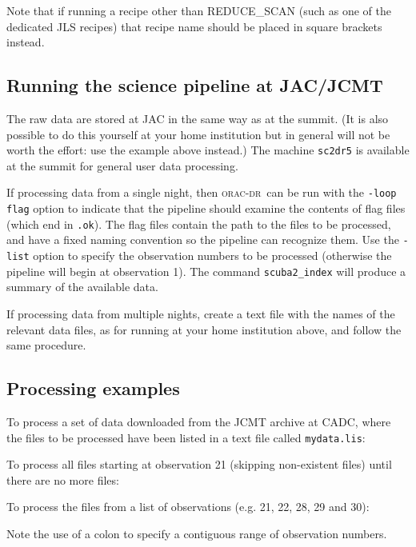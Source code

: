 \documentclass[twoside,11pt,nolof]{starlink}
\providecommand{\oracdr}{\textsc{orac-dr}}
\begin{document}
Note that if running a recipe other than REDUCE\_SCAN (such as one of
the dedicated JLS recipes) that recipe name should be placed in square
brackets instead.

\subsection{Running the science pipeline at JAC/JCMT}

The raw data are stored at JAC in the same way as at the summit. (It
is also possible to do this yourself at your home institution but in
general will not be worth the effort: use the example above instead.)
The machine \verb+sc2dr5+ is available at the summit for general user
data processing.

If processing data from a single night, then \oracdr\ can be run with
the \texttt{-loop flag} option to indicate that the pipeline should
examine the contents of flag files (which end in \verb+.ok+). The flag
files contain the path to the files to be processed, and have a fixed
naming convention so the pipeline can recognize them. Use the
\texttt{-list} option to specify the observation numbers to be
processed (otherwise the pipeline will begin at observation 1). The
command \verb+scuba2_index+ will produce a summary of the available
data.

If processing data from multiple nights, create a text file with the
names of the relevant data files, as for running at your home
institution above, and follow the same procedure.

\subsection{Processing examples\label{sse:examples}}

To process a set of data downloaded from the JCMT archive at CADC,
where the files to be processed have been listed in a text file called
\verb+mydata.lis+:
\begin{terminalv}
\end{terminalv}

To process all files starting at observation 21 (skipping non-existent
files) until there are no more files:
\begin{terminalv}
\end{terminalv}

To process the files from a list of observations (e.g. 21, 22, 28, 29 and
30):
\begin{terminalv}
\end{terminalv}
Note the use of a colon to specify a contiguous range of observation
numbers.
\end{document}

